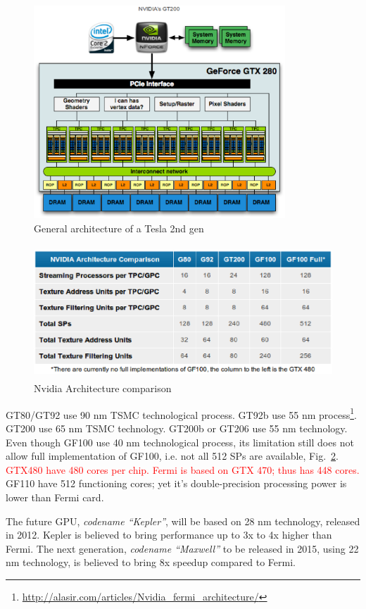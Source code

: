 \begin{figure}[hbt]
  \centerline{\includegraphics[height=8cm,
    angle=0]{./images/gtx200.eps}}
  \caption{General architecture of a Tesla 2nd gen}
  \label{fig:Nvidia_tesla}
\end{figure}


\begin{figure}[hbt]
  \centerline{\includegraphics[height=5cm,
    angle=0]{./images/info_tesla_fermi.eps}}
  \caption{Nvidia Architecture comparison}
  \label{fig:info_tesla_fermi}
\end{figure}

GT80/GT92 use 90 nm TSMC technological process. GT92b use 55 nm
process\footnote{\url{http://alasir.com/articles/Nvidia_fermi_architecture/}}.
GT200 use 65 nm TSMC technology. GT200b or GT206 use 55 nm
technology. Even though GF100 use 40 nm technological process, its
limitation still does not allow full implementation of GF100, i.e. not
all 512 SPs are available,
Fig.~\ref{fig:info_tesla_fermi}.
\textcolor{red}{GTX480 have 480 cores per chip. Fermi
is based on GTX 470; thus has 448 cores.} GF110 have 512 functioning cores;
  yet it's double-precision processing power is lower than Fermi card.

\begin{framed}
  The future GPU, {\it codename ``Kepler''}, will be based on 28 nm technology,
  released in 2012. Kepler is believed to bring
  performance up to 3x to 4x higher than Fermi. The next
  generation, {\it codename ``Maxwell''} to be released in 2015, using 22 nm
  technology, is believed to bring 8x speedup compared to Fermi.
\end{framed}


